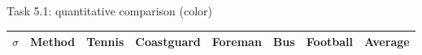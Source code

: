 \documentclass[mathserif, 8pt]{beamer}
\newcommand{\best}[1]{#1}
\newcommand{\bsic}[1]{\textcolor{gray}{#1}}
\newcommand{\Bsic}[1]{\textcolor{gray}{\textbf{#1}}}
\newcommand{\Best}[1]{\textbf{\textcolor{MyOrangeBrighter}{#1}}}
\begin{document}
\begin{frame}{Task 5.1: quantitative comparison (color)}
	\vspace{-.3cm}
	\begin{center}
		{\small
		\renewcommand{\tabcolsep}{0.8mm}
		\renewcommand{\arraystretch}{1.0}
		\begin{tabular}{ c | l |c c | c c | c c | c c | c c | c}
			\hline
			\rule{0pt}{6pt}$\sigma$ & Method            & \multicolumn{2}{c}{Tennis}  & \multicolumn{2}{c}{Coastguard}&\multicolumn{2}{c}{Foreman}& \multicolumn{2}{c}{Bus}     &\multicolumn{2}{c|}{Football}& Average\\\hline

\end{tabular}}
\end{center}
\end{frame}
\end{document}
